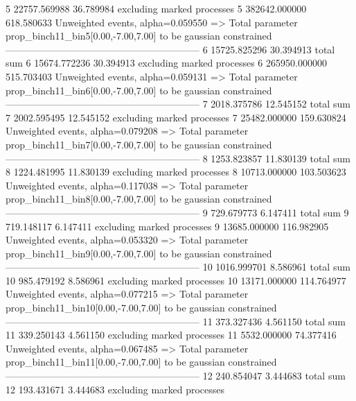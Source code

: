 5          22757.569988    36.789984       excluding marked processes    
5          382642.000000   618.580633      Unweighted events, alpha=0.059550
  => Total parameter prop_binch11_bin5[0.00,-7.00,7.00] to be gaussian constrained
------------------------------------------------------------
6          15725.825296    30.394913       total sum                     
6          15674.772236    30.394913       excluding marked processes    
6          265950.000000   515.703403      Unweighted events, alpha=0.059131
  => Total parameter prop_binch11_bin6[0.00,-7.00,7.00] to be gaussian constrained
------------------------------------------------------------
7          2018.375786     12.545152       total sum                     
7          2002.595495     12.545152       excluding marked processes    
7          25482.000000    159.630824      Unweighted events, alpha=0.079208
  => Total parameter prop_binch11_bin7[0.00,-7.00,7.00] to be gaussian constrained
------------------------------------------------------------
8          1253.823857     11.830139       total sum                     
8          1224.481995     11.830139       excluding marked processes    
8          10713.000000    103.503623      Unweighted events, alpha=0.117038
  => Total parameter prop_binch11_bin8[0.00,-7.00,7.00] to be gaussian constrained
------------------------------------------------------------
9          729.679773      6.147411        total sum                     
9          719.148117      6.147411        excluding marked processes    
9          13685.000000    116.982905      Unweighted events, alpha=0.053320
  => Total parameter prop_binch11_bin9[0.00,-7.00,7.00] to be gaussian constrained
------------------------------------------------------------
10         1016.999701     8.586961        total sum                     
10         985.479192      8.586961        excluding marked processes    
10         13171.000000    114.764977      Unweighted events, alpha=0.077215
  => Total parameter prop_binch11_bin10[0.00,-7.00,7.00] to be gaussian constrained
------------------------------------------------------------
11         373.327436      4.561150        total sum                     
11         339.250143      4.561150        excluding marked processes    
11         5532.000000     74.377416       Unweighted events, alpha=0.067485
  => Total parameter prop_binch11_bin11[0.00,-7.00,7.00] to be gaussian constrained
------------------------------------------------------------
12         240.854047      3.444683        total sum                     
12         193.431671      3.444683        excluding marked processes    

